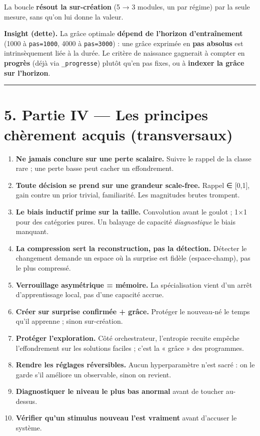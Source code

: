 \documentclass[
  french,
  11pt,
]{article}
\providecommand{\tightlist}{%
  \setlength{\itemsep}{0pt}\setlength{\parskip}{0pt}}
\begin{document}
La boucle \textbf{résout la sur-création} (5 → 3 modules, un par régime)
par la seule mesure, sans qu'on lui donne la valeur.

\textbf{Insight (dette).} La grâce optimale \textbf{dépend de l'horizon
d'entraînement} (1000 à \texttt{pas=1000}, 4000 à \texttt{pas=3000}) :
une grâce exprimée en \textbf{pas absolus} est intrinsèquement liée à la
durée. Le critère de naissance gagnerait à compter en \textbf{progrès}
(déjà via \texttt{\_progresse}) plutôt qu'en pas fixes, ou à
\textbf{indexer la grâce sur l'horizon}.

\begin{center}\rule{0.5\linewidth}{0.5pt}\end{center}

\section{5. Partie IV --- Les principes chèrement acquis
(transversaux)}\label{partie-iv-les-principes-chuxe8rement-acquis-transversaux}

\begin{enumerate}
\def\labelenumi{\arabic{enumi}.}
\tightlist
\item
  \textbf{Ne jamais conclure sur une perte scalaire.} Suivre le rappel
  de la classe rare ; une perte basse peut cacher un effondrement.
\item
  \textbf{Toute décision se prend sur une grandeur scale-free.} Rappel ∈
  {[}0,1{]}, gain contre un prior trivial, familiarité. Les magnitudes
  brutes trompent.
\item
  \textbf{Le biais inductif prime sur la taille.} Convolution avant le
  goulot ; 1×1 pour des catégories pures. Un balayage de capacité
  \emph{diagnostique} le biais manquant.
\item
  \textbf{La compression sert la reconstruction, pas la détection.}
  Détecter le changement demande un espace où la surprise est fidèle
  (espace-champ), pas le plus compressé.
\item
  \textbf{Verrouillage asymétrique = mémoire.} La spécialisation vient
  d'un arrêt d'apprentissage local, pas d'une capacité accrue.
\item
  \textbf{Créer sur surprise confirmée + grâce.} Protéger le nouveau-né
  le temps qu'il apprenne ; sinon sur-création.
\item
  \textbf{Protéger l'exploration.} Côté orchestrateur, l'entropie
  recuite empêche l'effondrement sur les solutions faciles ; c'est la «
  grâce » des programmes.
\item
  \textbf{Rendre les réglages réversibles.} Aucun hyperparamètre n'est
  sacré : on le garde s'il améliore un observable, sinon on revient.
\item
  \textbf{Diagnostiquer le niveau le plus bas anormal} avant de toucher
  au-dessus.
\item
  \textbf{Vérifier qu'un stimulus nouveau l'est vraiment} avant
  d'accuser le système.
\end{enumerate}
\end{document}
